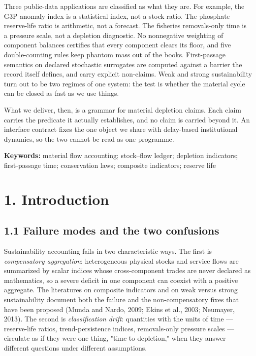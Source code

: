 \documentclass[11pt]{article}
\begin{document}
Three public-data applications are classified as what they are. For example, the G3P anomaly index is a statistical index, not a stock ratio. The phosphate reserve-life ratio is arithmetic, not a forecast. The fisheries removals-only time is a pressure scale, not a depletion diagnostic. No nonnegative weighting of component balances certifies that every component clears its floor, and five double-counting rules keep phantom mass out of the books. First-passage semantics on declared stochastic surrogates are computed against a barrier the record itself defines, and carry explicit non-claims. Weak and strong sustainability turn out to be two regimes of one system: the test is whether the material cycle can be closed as fast as we use things.

What we deliver, then, is a grammar for material depletion claims. Each claim carries the predicate it actually establishes, and no claim is carried beyond it. An interface contract fixes the one object we share with delay-based institutional dynamics, so the two cannot be read as one programme.

\textbf{Keywords:} material flow accounting; stock--flow ledger; depletion indicators; first-passage time; conservation laws; composite indicators; reserve life

\vspace{0.8em}

\section*{1. Introduction}\label{1-introduction}

\subsection*{1.1 Failure modes and the two confusions}\label{11-failure-modes-and-the-two-confusions}

Sustainability accounting fails in two characteristic ways. The first is \emph{compensatory aggregation}: heterogeneous physical stocks and service flows are summarized by scalar indices whose cross-component trades are never declared as mathematics, so a severe deficit in one component can coexist with a positive aggregate. The literatures on composite indicators and on weak versus strong sustainability document both the failure and the non-compensatory fixes that have been proposed (Munda and Nardo, 2009; Ekins et al., 2003; Neumayer, 2013). The second is \emph{classification drift}: quantities with the units of time --- reserve-life ratios, trend-persistence indices, removals-only pressure scales --- circulate as if they were one thing, "time to depletion," when they answer different questions under different assumptions.
\end{document}
